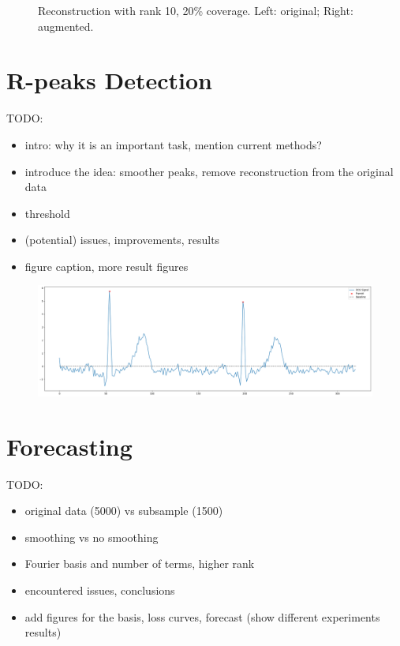 \documentclass{mldsmsc}
\begin{document}
\begin{figure}[H]
\begin{minipage}{0.4\linewidth}
    \label{fig:augmented}
\end{minipage}
\caption{Reconstruction with rank 10, 20\% coverage. Left: original; Right: augmented.}
\end{figure}

\section{R-peaks Detection}

TODO:
\begin{itemize}
    \item intro: why it is an important task, mention current methods?
    \item introduce the idea: smoother peaks, remove reconstruction from the original data
    \item threshold
    \item (potential) issues, improvements, results
    \item figure caption, more result figures
\end{itemize}

\begin{figure}[H]
\centering
\includegraphics[width=1\linewidth]{images/r_peaks.png}
\label{fig:r-peaks}
\end{figure}

\section{Forecasting}

TODO:

\begin{itemize}
    \item original data (5000) vs subsample (1500)
    \item smoothing vs no smoothing
    \item Fourier basis and number of terms, higher rank
    \item encountered issues, conclusions
    \item add figures for the basis, loss curves, forecast (show different experiments results)
\end{itemize}
\end{document}
